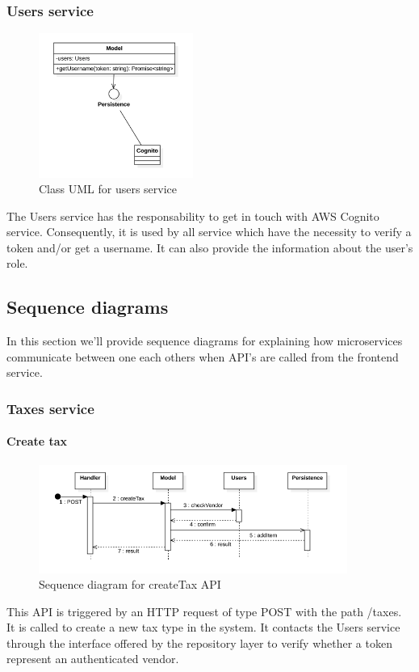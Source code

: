 \subsubsection{Users service}
\begin{figure}[H]
    \includegraphics[width=0.45\textwidth]{res/images/class-diagrams/users.png}
    \caption{Class UML for users service}
\end{figure}
The Users service has the responsability to get in touch with AWS Cognito service. Consequently, it is used by all service which have the necessity to verify
a token and/or get a username. It can also provide the information about the user's role.


\subsection{Sequence diagrams} \label{_sequenceDiagram}
In this section we'll provide sequence diagrams for explaining how microservices communicate between one each others when API's are called from the frontend service.

\subsubsection{Taxes service}
\paragraph*{Create tax}
\begin{figure}[H]
    \includegraphics[width=0.9\textwidth]{res/images/sequence-diagrams/taxes/createTax.png}
    \caption{Sequence diagram for createTax API}
\end{figure}
This API is triggered by an HTTP request of type POST with the path /taxes. It is called to create a new tax type in the system. It contacts the Users service through the interface offered by the repository layer to verify
whether a token represent an authenticated vendor.

